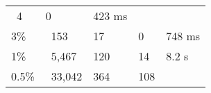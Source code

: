 \documentclass[11pt]{article}
\begin{document}
\begin{longtable}[]{@{}lllll@{}}
\begin{minipage}[t]{0.20\columnwidth}
~4\strut
\end{minipage} & \begin{minipage}[t]{0.20\columnwidth}\raggedright
0\strut
\end{minipage} & \begin{minipage}[t]{0.13\columnwidth}\raggedright
423 ms\strut
\end{minipage}\tabularnewline
\begin{minipage}[t]{0.14\columnwidth}\raggedright
3\%\strut
\end{minipage} & \begin{minipage}[t]{0.18\columnwidth}\raggedright
~153\strut
\end{minipage} & \begin{minipage}[t]{0.20\columnwidth}\raggedright
17\strut
\end{minipage} & \begin{minipage}[t]{0.20\columnwidth}\raggedright
0\strut
\end{minipage} & \begin{minipage}[t]{0.13\columnwidth}\raggedright
748 ms\strut
\end{minipage}\tabularnewline
\begin{minipage}[t]{0.14\columnwidth}\raggedright
1\%\strut
\end{minipage} & \begin{minipage}[t]{0.18\columnwidth}\raggedright
~5,467\strut
\end{minipage} & \begin{minipage}[t]{0.20\columnwidth}\raggedright
120\strut
\end{minipage} & \begin{minipage}[t]{0.20\columnwidth}\raggedright
14\strut
\end{minipage} & \begin{minipage}[t]{0.13\columnwidth}\raggedright
8.2 s\strut
\end{minipage}\tabularnewline
\begin{minipage}[t]{0.14\columnwidth}\raggedright
0.5\%\strut
\end{minipage} & \begin{minipage}[t]{0.18\columnwidth}\raggedright
~33,042\strut
\end{minipage} & \begin{minipage}[t]{0.20\columnwidth}\raggedright
364\strut
\end{minipage} & \begin{minipage}[t]{0.20\columnwidth}\raggedright
108\strut
\end{minipage} & \begin{minipage}[t]{0.13\columnwidth}\raggedright

\end{minipage}
\end{longtable}
\end{document}
